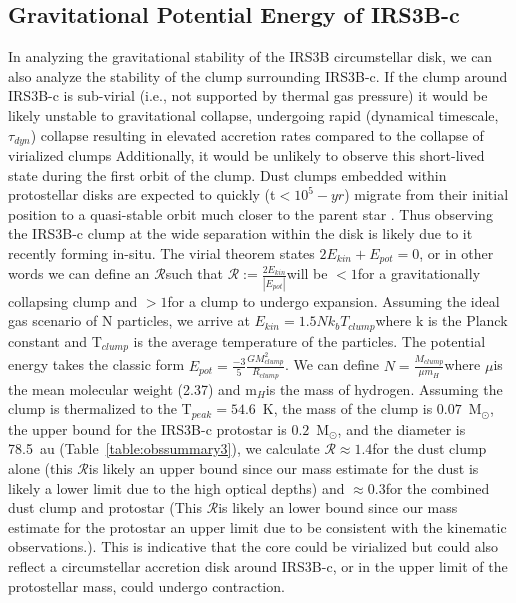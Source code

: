 \documentclass[twocolumn, 12pt,trackchanges]{aastex63}
\newcommand{\solm}{M$_{\odot}$}
\begin{document}


\subsection{Gravitational Potential Energy of IRS3B-c}\label{sec:gpe}
In analyzing the gravitational stability of the IRS3B circumstellar disk, we can also analyze the stability of the clump surrounding IRS3B-c. If the clump around IRS3B-c is sub-virial (i.e., not supported by thermal gas pressure) it would be likely unstable to gravitational collapse, undergoing rapid (dynamical timescale, $\tau_{dyn}$) collapse resulting in elevated accretion rates compared to the collapse of virialized clumps Additionally, it would be unlikely to observe this short-lived state during the first orbit of the clump. Dust clumps embedded within protostellar disks are expected to quickly (t$<10^{5}-yr$) migrate from their initial position to a quasi-stable orbit much closer to the parent star \citep{2019AA...631A...1V}. Thus observing the IRS3B-c clump at the wide separation within the disk is likely due to it recently forming in-situ. The virial theorem states $2E_{kin} + E_{pot}=0$, or in other words we can define an $\mathcal{R}$\space such that $\mathcal{R} := \frac{2E_{kin}}{|E_{pot}|}$\space will be $<1$\space for a gravitationally collapsing clump and $>1$\space for a clump to undergo expansion. Assuming the ideal gas scenario of N particles, we arrive at $E_{kin} = 1.5Nk_{b}T_{clump}$\space where k is the Planck constant and T$_{clump}$ is the average temperature of the particles. The potential energy takes the classic form $E_{pot} = \frac{-3}{5}\frac{GM^{2}_{clump}}{R_{clump}}$. We can define $N=\frac{M_{clump}}{\mu m_{H}}$\space where $\mu$\space is the mean molecular weight (2.37) and m$_{H}$\space is the mass of hydrogen. Assuming the clump is thermalized to the T$_{peak}=54.6$~K, the mass of the clump is $0.07$~\solm, the upper bound for the IRS3B-c protostar is $0.2$~\solm, and the diameter is 78.5~au (Table~\ref{table:obssummary3}), we calculate $\mathcal{R} \approx1.4$\space for the dust clump alone (this $\mathcal{R}$\space is likely an upper bound since our mass estimate for the dust is likely a lower limit due to the high optical depths) and $\approx0.3$\space for the combined dust clump and protostar (This $\mathcal{R}$\space is likely an lower bound since our mass estimate for the protostar an upper limit due to be consistent with the kinematic observations.). This is indicative that the core could be virialized but could also reflect a circumstellar accretion disk around IRS3B-c, or in the upper limit of the protostellar mass, could undergo contraction.
\end{document}
